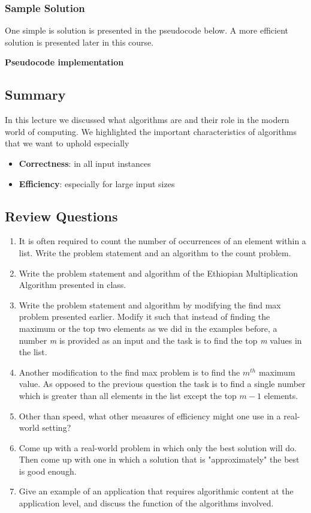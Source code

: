 \documentclass[12pt,a4paper]{book}
\begin{document}
\subsubsection{Sample Solution}
One simple is solution is presented in the pseudocode below. A more efficient solution is presented later in this course.\par
\noindent \textbf {Pseudocode implementation}

\subsection{Summary}
In this lecture we discussed what algorithms are and their role in the modern world of computing. We highlighted the important characteristics of algorithms that we want to uphold especially 
\begin{itemize}
\item \textbf{Correctness}: in all input instances
\item \textbf{Efficiency}: especially for large input sizes
\end{itemize}
\subsection{Review Questions}
\begin{enumerate}
\item It is often required to count the number of occurrences of an element within a list. Write the problem statement and an algorithm to the count problem. 
\item Write the problem statement and algorithm of the Ethiopian Multiplication Algorithm presented in class. 
\item Write the problem statement and algorithm by modifying the find max problem presented earlier. Modify it such that instead of finding the maximum or the top two elements as we did in the examples before, a number \textit{m} is provided as an input and the task is to find the top \textit{m} values in the list.
\item Another modification to the find max problem is to find the $m ^{th} $ maximum value. As opposed to the previous question the task is to find a single number which is greater than all elements in the list except the top $m-1$ elements.
\item Other than speed, what other measures of efficiency might one use in a real-world setting?
\item Come up with a real-world problem in which only the best solution will do. Then come up with one in which a solution that is "approximately" the best is good enough.
\item Give an example of an application that requires algorithmic content at the application level, and discuss the function of the algorithms involved.
\end{enumerate}
\end{document}
